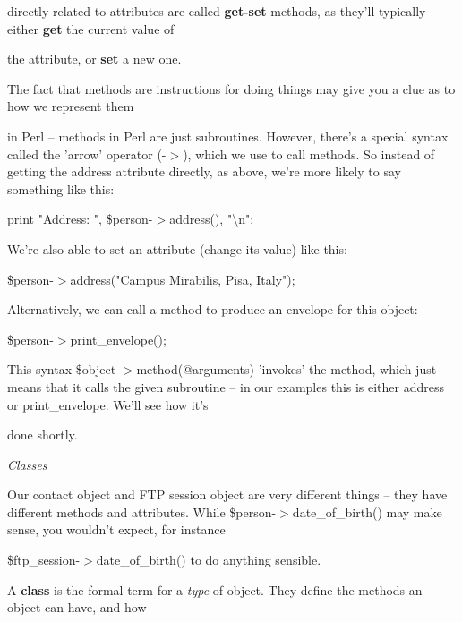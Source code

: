 \documentclass[a4paper,11pt]{book}
\begin{document}
\noindent directly related to attributes are called \textbf{get-set }methods, as they'll typically either \textbf{get }the current value of

\noindent the attribute, or \textbf{set }a new one.

\noindent 

\noindent The fact that methods are instructions for doing things may give you a clue as to how we represent them

\noindent in Perl -- methods in Perl are just subroutines. However, there's a special syntax called the 'arrow' operator (-$>$), which we use to call methods. So instead of getting the address attribute directly, as above, we're more likely to say something like this:

\noindent 

\noindent print "Address: ", \$person-$>$address(), "\textbackslash n";

\noindent 

\noindent We're also able to set an attribute (change its value) like this:

\noindent 

\noindent \$person-$>$address("Campus Mirabilis, Pisa, Italy");

\noindent 

\noindent Alternatively, we can call a method to produce an envelope for this object:

\noindent 

\noindent \$person-$>$print\_envelope();

\noindent 

\noindent This syntax \$object-$>$method(@arguments) 'invokes' the method, which just means that it calls the given subroutine -- in our examples this is either address or print\_envelope. We'll see how it's

\noindent done shortly.

\noindent 

\noindent 

\noindent \textit{Classes}

\noindent Our contact object and FTP session object are very different things -- they have different methods and attributes. While \$person-$>$date\_of\_birth() may make sense, you wouldn't expect, for instance

\noindent \$ftp\_session-$>$date\_of\_birth() to do anything sensible.

\noindent 

\noindent A \textbf{class }is the formal term for a \textit{type }of object. They define the methods an object can have, and how
\end{document}
